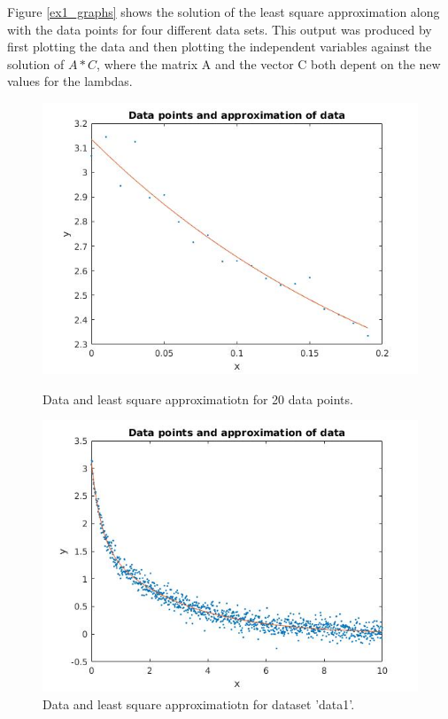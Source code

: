 \documentclass[12pt]{article}
\begin{document}
Figure \ref{ex1_graphs} shows the solution of the least square approximation along with the data points for four different data sets. This output was produced by first plotting the data and then plotting the independent variables against the solution of $A * C$, where the matrix A and the vector C both depent on the new values for the lambdas.
\begin{figure}[H]
\parbox[t]{0.4\textwidth}{
	\includegraphics[width=\linewidth,natwidth=610,natheight=642]{ex1_testdata.jpg}
	\caption{Data and least square approximatiotn for 20 data points.}
}
\hfill
\parbox[t]{0.4\textwidth}{
	\includegraphics[width=\linewidth,natwidth=610,natheight=642]{ex1_data1.jpg}
	\caption {Data and least square approximatiotn for dataset 'data1'.}
}
\end{figure}
\end{document}
